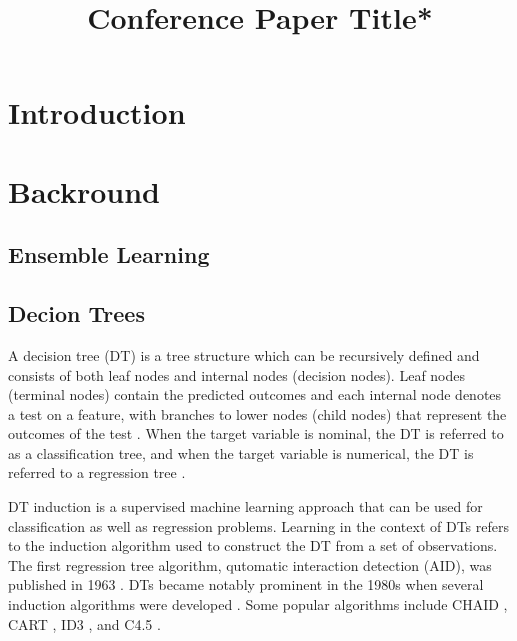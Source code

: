 \documentclass[conference]{IEEEtran}
\begin{document}
\title{Conference Paper Title*\\}

\author{
}

\maketitle

\begin{abstract}

\end{abstract}

\section{Introduction}


\section{Backround}

    \subsection{Ensemble Learning}


    \subsection{Decion Trees}

        A decision tree (DT) is a tree structure which can be recursively defined and consists of both leaf nodes
        and internal nodes (decision nodes). Leaf nodes (terminal nodes) contain the predicted outcomes and each internal
        node denotes a test on a feature, with branches to lower nodes (child nodes) that represent the outcomes of the
        test \cite{DT_Rokach2010, GavinPotgieter}. When the target variable is nominal, the DT is referred to as a classification
        tree, and when the target variable is numerical, the DT is referred to a regression tree \cite{DT_Kotsiantis2013, DT_Blockeel2023}.

        DT induction is a supervised machine learning approach that can be used for classification as well as regression problems.
        Learning in the context of DTs refers to the induction algorithm used to construct the DT from a set of observations.
        The first regression tree algorithm, qutomatic interaction detection (AID), was published in 1963 \cite{DT_Morgan1963ProblemsIT}.
        DTs became notably prominent in the 1980s when several induction algorithms were developed \cite{DT_Kotsiantis2013}. Some popular
        algorithms include  CHAID \cite{DT_Kass1980}, CART \cite{DT_breiman1984classification}, ID3 \cite{DT_quinlan1986}, and C4.5 \cite{DT_quinlan1993}.
        
\end{document}
